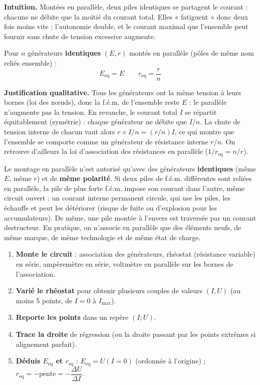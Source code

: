 \documentclass[11pt]{article}
\begin{document}
\textbf{Intuition.} Montées en parallèle, deux piles identiques se partagent le courant : chacune ne débite que la moitié du courant total. Elles « fatiguent » donc deux fois moins vite : l'autonomie double, et le courant maximal que l'ensemble peut fournir sans chute de tension excessive augmente.

\begin{propriete}
Pour $n$ générateurs \textbf{identiques} $(E, r)$ montés en parallèle (pôles de même nom reliés ensemble) :
\[ \boxed{E_{\text{eq}} = E} \qquad \boxed{r_{\text{eq}} = \dfrac{r}{n}} \]
\end{propriete}

\textbf{Justification qualitative.} Tous les générateurs ont la même tension à leurs bornes (loi des nœuds), donc la f.é.m. de l'ensemble reste $E$ : le parallèle n'augmente pas la tension. En revanche, le courant total $I$ se répartit équitablement (symétrie) : chaque générateur ne débite que $I/n$. La chute de tension interne de chacun vaut alors $r \times I/n = (r/n) I$, ce qui montre que l'ensemble se comporte comme un générateur de résistance interne $r/n$. On retrouve d'ailleurs la loi d'association des résistances en parallèle ($1/r_{\text{eq}} = n/r$).

\begin{attention}
Le montage en parallèle n'est autorisé qu'avec des générateurs \textbf{identiques} (même $E$, même $r$) et de \textbf{même polarité}. Si deux piles de f.é.m. différentes sont reliées en parallèle, la pile de plus forte f.é.m. impose son courant dans l'autre, même circuit ouvert : un courant interne permanent circule, qui use les piles, les échauffe et peut les détériorer (risque de fuite ou d'explosion pour les accumulateurs). De même, une pile montée à l'envers est traversée par un courant destructeur. En pratique, on n'associe en parallèle que des éléments neufs, de même marque, de même technologie et de même état de charge.
\end{attention}

\begin{methode}[Tracer la caractéristique $U = f(I)$ d'une association de générateurs]
\begin{enumerate}
\item \textbf{Monte le circuit} : association des générateurs, rhéostat (résistance variable) en série, ampèremètre en série, voltmètre en parallèle sur les bornes de l'association.
\item \textbf{Varié le rhéostat} pour obtenir plusieurs couples de valeurs $(I, U)$ (au moins 5 points, de $I=0$ à $I_{\text{max}}$).
\item \textbf{Reporte les points} dans un repère $(I ; U)$.
\item \textbf{Trace la droite} de régression (ou la droite passant par les points extrêmes si alignement parfait).
\item \textbf{Déduis $E_{\text{eq}}$ et $r_{\text{eq}}$} : $E_{\text{eq}} = U(I=0)$ (ordonnée à l'origine) ; $r_{\text{eq}} = -\text{pente} = -\dfrac{\Delta U}{\Delta I}$.
\end{enumerate}
\end{methode}
\end{document}
